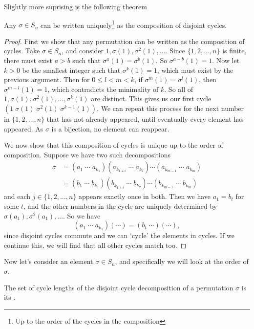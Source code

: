 \documentclass[a4]{scrreprt}
\begin{document}
Slightly more suprising is the following theorem
\begin{theorem}
	Any $\sigma \in S_n$ can be written uniquely\footnote{Up to the order of the cycles in the composition} as the composition of disjoint cycles.
\end{theorem}
\begin{proof}
	First we show that any permutation can be written as the composition of cycles.
	Take $\sigma \in S_n$, and consider $1, \sigma(1), \sigma^2(1), \dots$. Since $\{1, 2, \dots, n\}$ is finite, there must exist $a > b$ such that $\sigma^a(1) = \sigma^b(1)$. So $\sigma^{a -b}(1) = 1$. Now let $k > 0$ be the smallest integer such that $\sigma^k(1) = 1$, which must exist by the previous argument. Then for $0 \leq l < m < k$, if $\sigma^m(1) = \sigma^l(1)$, then $\sigma^{m - l}(1) = 1$, which contradicts the minimality of $k$. So all of $1, \sigma(1), \sigma^2(1), \dots, \sigma^k(1)$ are distinct. This gives us our first cycle $(1\; \sigma(1)\; \sigma^2(1)\; \sigma^{k - 1}(1))$.
	We can repeat this process for the next number in $\{1, 2, \dots, n\}$ that has not already appeared, until eventually every element has appeared. As $\sigma$ is a bijection, no element can reappear.

	We now show that this composition of cycles is unique up to the order of composition. Suppose we have two such decompositions
	\begin{align*}
		\sigma &= (a_1 \; \cdots \; a_{k_1}) (a_{k_{1 + i}} \; \cdots \; a_{k_2}) \cdots (a_{k_{m - 1}} \; \cdots \; a_{k_m})\\
		  &= (b_1 \; \cdots \; b_{k_1}) (b_{k_{1 + i}} \; \cdots \; b_{k_2}) \cdots (b_{k_{m - 1}} \; \cdots \; b_{k_m})
	\end{align*}
	and each $j \in \{1, 2, \dots, n\}$ appears exactly once in both. Then we have $a_1 = b_t$ for some $t$, and the other numbers in the cycle are uniquely determined by $\sigma(a_1), \sigma^2(a_1), \dots$. So we have
	$$
	(a_1\; \cdots\; a_{k_1}) (\cdots) = (b_t\; \cdots)(\cdots),
	$$
	since disjoint cycles commute and we can `cycle' the elements in cycles. If we continue this, we will find that all other cycles match too.
\end{proof}

Now let's consider an element $\sigma \in S_n$, and specifically we will look at the order of $\sigma$.

\begin{definition}
	The set of cycle lengths of the disjoint cycle decomposition of a permutation $\sigma$ is its .
\end{definition}
\end{document}
